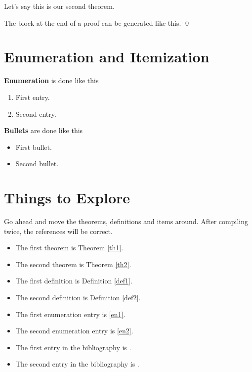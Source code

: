 \begin{theorem}
\label{th2}

Let's say this is our second theorem.

\end{theorem}



The block at the end of a proof can be generated like this. \qed


\section{Enumeration and Itemization}

{\bf Enumeration} is done like this

\begin{enumerate}
\item
\label{en1}
First entry.

\item
\label{en2}
Second entry.

\end{enumerate}


{\bf Bullets} are done like this

\begin{itemize}
\item
First bullet.

\item
Second bullet.

\end{itemize}





\section{Things to Explore}
\label{explore}

Go ahead and move the theorems, definitions and items around.
After compiling twice, the references will be correct.

\begin{itemize}
\item
The first theorem is Theorem \ref{th1}.

\item
The second theorem is Theorem \ref{th2}.

\item
The first definition is Definition \ref{def1}.

\item
The second definition is Definition \ref{def2}.

\item
The first enumeration entry is \ref{en1}.

\item
The second enumeration entry is \ref{en2}.


\item
The first entry in the bibliography is \cite{bib1}.

\item
The second entry in the bibliography is \cite{bib2}.

\end{itemize}


